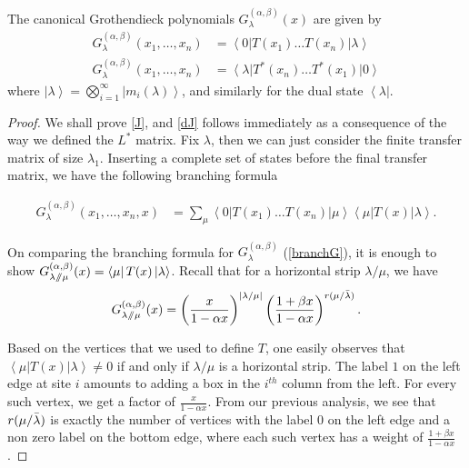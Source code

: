 \documentclass[ALCO, Unicode]{cedram}
\newcommand{\sslash}{\mathbin{/\mkern-6mu/}}
\newcommand{\bra}[1]{\left\langle #1\right|}
\newcommand{\ket}[1]{\left|#1\right\rangle}
\newcommand\Gg{{G^{(\alpha,\beta)}_{\lambda}}}
\begin{document}
\begin{thm}
\label{thm:rowG}
The canonical Grothendieck polynomials $\Gg(x)$  are given by
%
\begin{align}
\label{J}
\Gg(x_1,\dots,x_n)
&=
\bra{0}
T(x_1)
\dots
T(x_n)
\ket{\lambda}
\\
\label{dJ}
\Gg(x_1,\dots,x_n)
&=
\bra{\lambda}
T^{*}(x_n)
\dots
T^{*}(x_1)
\ket{0}
\end{align}
%
where $\ket{\lambda} = \bigotimes_{i=1}^{\infty} \ket{m_i(\lambda)}$, and similarly for the dual state $\bra{\lambda}$.
\end{thm}

\begin{proof}
We shall prove \eqref{J}, and \eqref{dJ} follows immediately as a consequence of the way we defined the $L^{*}$ matrix. Fix $\lambda$, then we can just consider the finite transfer matrix of size $\lambda_1$. Inserting a complete set of states before the final transfer matrix, we have the following branching formula

\begin{align*}
    \Gg(x_1,\dots,x_n,x)
&=
\sum_{\mu}
\bra{0}
T(x_1)
\dots
T(x_n)
\ket{\mu}
\bra{\mu}
T(x)
\ket{\lambda}.
\end{align*}

On comparing the branching formula for $\Gg$ (\cref{branchG}), it is enough to show $G^{(\alpha,\beta)}_{\lambda\sslash\mu}(x)=\bra{\mu}T(x)\ket{\lambda}$.
Recall that for a horizontal strip $\lambda/\mu$, we have
\begin{align*}
G^{(\alpha,\beta)}_{\lambda\sslash\mu}(x)= 
\left(
\frac{x}{1-\alpha x}
\right)^{|\lambda/\mu|}
\left(
\frac{1+\beta x}{1-\alpha x}
\right)^{r(\mu/\Bar{\lambda})}.
\end{align*}

Based on the vertices that we used to define $T$, one easily observes that $\bra{\mu}T(x) \ket{\lambda}\neq 0$ if and only if $\lambda/\mu$ is a horizontal strip. The label $1$ on the left edge at site $i$ amounts to adding a box in the $i^{th}$ column from the left. For every such vertex, we get a factor of $\frac{x}{1-\alpha x}$. From our previous analysis, we see that $r(\mu/\Bar{\lambda})$ is exactly the number of vertices with the label $0$ on the left edge and a non zero label on the bottom edge, where each such vertex has a weight of $\frac{1+\beta x}{1-\alpha x}$.
\end{proof}
\end{document}

